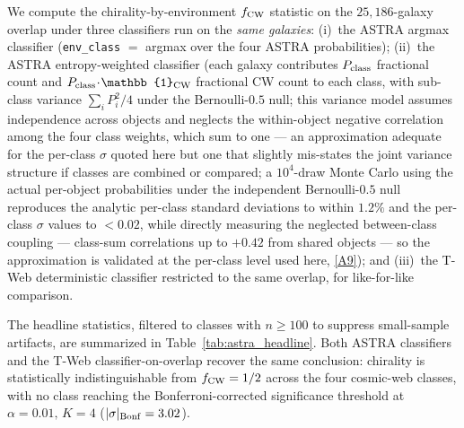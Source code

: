 \documentclass[aps,prd,twocolumn,superscriptaddress,showpacs,preprintnumbers,nofootinbib,longbibliography,floatfix]{revtex4-2}
\newcommand{\repoBase}{https://github.com/Hubify-Projects/bigbounce/blob/main}
\begin{document}
We compute the chirality-by-environment $f_{\rm CW}$ statistic on the
$25{,}186$-galaxy overlap under three classifiers run on the
\emph{same galaxies}: (i)~the ASTRA argmax classifier
(\texttt{env\_class} $=$ argmax over the four ASTRA probabilities);
(ii)~the ASTRA entropy-weighted classifier (each galaxy contributes
$P_{\rm class}$ fractional count and $P_{\rm class}\!\cdot\!\mathbb{1}_{\rm CW}$
fractional CW count to each class, with sub-class variance
$\textstyle\sum_i P_i^2 / 4$ under the Bernoulli-$0.5$ null; this
variance model assumes independence across objects and neglects the
within-object negative correlation among the four class weights,
which sum to one --- an approximation adequate for the per-class
$\sigma$ quoted here but one that slightly mis-states the joint
variance structure if classes are combined or compared; a $10^4$-draw
Monte Carlo using the actual per-object probabilities under the
independent Bernoulli-$0.5$ null reproduces the analytic per-class
standard deviations to within $1.2\%$ and the per-class $\sigma$
values to $<\!0.02$, while directly measuring the neglected
between-class coupling --- class-sum correlations up to $+0.42$ from
shared objects --- so the approximation is validated at the per-class
level used here,
\href{\repoBase/pipelines/p5\_desi\_chirality/outputs/22\_r24conf\_local\_batch.json}{[A9]}); and
(iii)~the T-Web deterministic classifier restricted to the same
overlap, for like-for-like comparison.

The headline statistics, filtered to classes with $n \geq 100$ to
suppress small-sample artifacts, are summarized in
Table~\ref{tab:astra_headline}. Both ASTRA classifiers and the T-Web
classifier-on-overlap recover the same conclusion: chirality is
statistically indistinguishable from $f_{\rm CW} = 1/2$ across the
four cosmic-web classes, with no class reaching the
Bonferroni-corrected significance threshold at $\alpha = 0.01,\,K = 4$
($|\sigma|_{\rm Bonf} = 3.02$).
\end{document}
